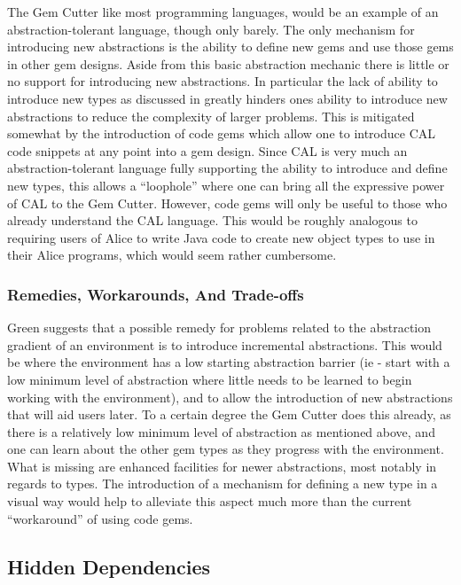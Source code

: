 The Gem Cutter like most programming languages, would be an example of an abstraction-tolerant language, though only barely.  The only mechanism for introducing new abstractions is the ability to define new gems and use those gems in other gem designs.  Aside from this basic abstraction mechanic there is little or no support for introducing new abstractions.  In particular the lack of ability to introduce new types as discussed in  greatly hinders ones ability to introduce new abstractions to reduce the complexity of larger problems.  This is mitigated somewhat by the introduction of code gems which allow one to introduce CAL code snippets at any point into a gem design.  Since CAL is very much an abstraction-tolerant language fully supporting the ability to introduce and define new types, this allows a ``loophole'' where one can bring all the expressive power of CAL to the Gem Cutter.  However, code gems will only be useful to those who already understand the CAL language.  This would be roughly analogous to requiring users of Alice to write Java code to create new object types to use in their Alice programs, which would seem rather cumbersome.

\subsubsection{Remedies, Workarounds, And Trade-offs}

Green suggests that a possible remedy for problems related to the abstraction gradient of an environment is to introduce incremental abstractions.  This would be where the environment has a low starting abstraction barrier (ie - start with a low minimum level of abstraction where little needs to be learned to begin working with the environment), and to allow the introduction of new abstractions that will aid users later.  To a certain degree the Gem Cutter does this already, as there is a relatively low minimum level of abstraction as mentioned above, and one can learn about the other gem types as they progress with the environment.  What is missing are enhanced facilities for newer abstractions, most notably in regards to types.  The introduction of a mechanism for defining a new type in a visual way would help to alleviate this aspect much more than the current ``workaround'' of using code gems.

\subsection{Hidden Dependencies}

